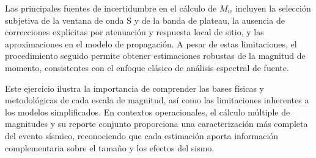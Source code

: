 \documentclass[a4paper,12pt]{article} %
\numberwithin{equation}{section} %
\numberwithin{figure}{section} %
\begin{document}
Las principales fuentes de incertidumbre en el cálculo de $M_w$ incluyen la selección subjetiva de la ventana de onda S y de la banda de plateau, la ausencia de correcciones explícitas por atenuación y respuesta local de sitio, y las aproximaciones en el modelo de propagación. A pesar de estas limitaciones, el procedimiento seguido permite obtener estimaciones robustas de la magnitud de momento, consistentes con el enfoque clásico de análisis espectral de fuente.

Este ejercicio ilustra la importancia de comprender las bases físicas y metodológicas de cada escala de magnitud, así como las limitaciones inherentes a los modelos simplificados. En contextos operacionales, el cálculo múltiple de magnitudes y su reporte conjunto proporciona una caracterización más completa del evento sísmico, reconociendo que cada estimación aporta información complementaria sobre el tamaño y los efectos del sismo.
\newpage
\clearpage
\newpage


\end{document}
